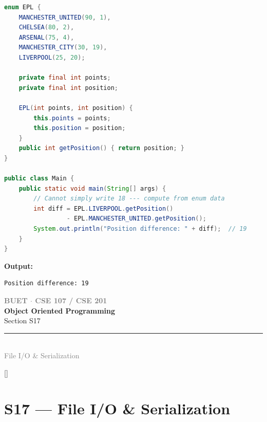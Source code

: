 \documentclass[12pt,a3paper]{article}
\newcommand{\secdivider}[4]{%
  \newpage\thispagestyle{empty}%
  \vspace*{\fill}%
  \begin{tcolorbox}[enhanced,colback=#4!7,colframe=#3,boxrule=1.5pt,arc=8pt,
    left=20pt,right=20pt,top=22pt,bottom=22pt,
    shadow={3pt}{-3pt}{0pt}{black!15}]
    \centering
    {\large\textcolor{gray}{\textbf{BUET $\cdot$ CSE 107 / CSE 201}}}\\[8pt]
    {\fontsize{26}{32}\selectfont\bfseries\textcolor{#3}{Object Oriented Programming}}\\[6pt]
    {\fontsize{15}{19}\selectfont\textcolor{dgray}{#1}}\\[12pt]
    \textcolor{#3!60}{\rule{0.5\textwidth}{0.5pt}}\\[6pt]
    {\small\textcolor{gray}{#2}}
  \end{tcolorbox}%
  \vspace*{\fill}\newpage%
}
\begin{document}
\begin{enumerate}
\begin{tcolorbox}[enhanced,breakable,ansbox,
  colback=cH!4,colframe=cH,boxrule=0.8pt,arc=5pt,
  title={\textbf{Answer --- \texttt{EPL} Enum: Position Difference}},
  fonttitle=\bfseries\color{white},colbacktitle=cH]
\begin{lstlisting}[language=Java]
enum EPL {
    MANCHESTER_UNITED(90, 1),
    CHELSEA(80, 2),
    ARSENAL(75, 4),
    MANCHESTER_CITY(30, 19),
    LIVERPOOL(25, 20);

    private final int points;
    private final int position;

    EPL(int points, int position) {
        this.points = points;
        this.position = position;
    }
    public int getPosition() { return position; }
}

public class Main {
    public static void main(String[] args) {
        // Cannot simply write 18 --- compute from enum data
        int diff = EPL.LIVERPOOL.getPosition()
                 - EPL.MANCHESTER_UNITED.getPosition();
        System.out.println("Position difference: " + diff);  // 19
    }
}
\end{lstlisting}

\textbf{Output:}
\begin{lstlisting}
Position difference: 19
\end{lstlisting}

\end{tcolorbox}

\end{enumerate}
\newpage

\secdivider{Section S17}{File I/O \& Serialization}{cA}{cA}
\label{sec:S17}
\titleformat{\section}{\large\bfseries\color{cA}}{}{0em}{}[\titlerule]
\section{S17 --- File I/O \& Serialization}
\end{document}
